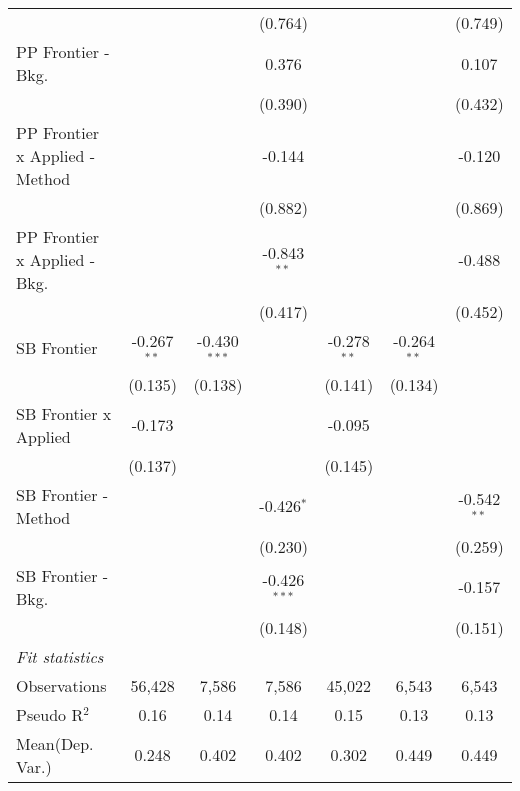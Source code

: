 \begin{tabular}{lcccccc}
                                  &                &                & (0.764)        &                &                & (0.749)\\   
   PP Frontier - Bkg.             &                &                & 0.376          &                &                & 0.107\\   
                                  &                &                & (0.390)        &                &                & (0.432)\\   
   PP Frontier x Applied - Method &                &                & -0.144         &                &                & -0.120\\   
                                  &                &                & (0.882)        &                &                & (0.869)\\   
   PP Frontier x Applied - Bkg.   &                &                & -0.843$^{**}$  &                &                & -0.488\\   
                                  &                &                & (0.417)        &                &                & (0.452)\\   
   SB Frontier                    & -0.267$^{**}$  & -0.430$^{***}$ &                & -0.278$^{**}$  & -0.264$^{**}$  &   \\   
                                  & (0.135)        & (0.138)        &                & (0.141)        & (0.134)        &   \\   
   SB Frontier x Applied          & -0.173         &                &                & -0.095         &                &   \\   
                                  & (0.137)        &                &                & (0.145)        &                &   \\   
   SB Frontier - Method           &                &                & -0.426$^{*}$   &                &                & -0.542$^{**}$\\   
                                  &                &                & (0.230)        &                &                & (0.259)\\   
   SB Frontier - Bkg.             &                &                & -0.426$^{***}$ &                &                & -0.157\\   
                                  &                &                & (0.148)        &                &                & (0.151)\\   
   \midrule
   \emph{Fit statistics}\\
   Observations                   & 56,428         & 7,586          & 7,586          & 45,022         & 6,543          & 6,543\\  
   Pseudo R$^2$                   & 0.16           & 0.14           & 0.14           & 0.15           & 0.13           & 0.13\\  
Mean(Dep. Var.) & 0.248 & 0.402 & 0.402 & 0.302 & 0.449 & 0.449 \\
   

\end{tabular}
